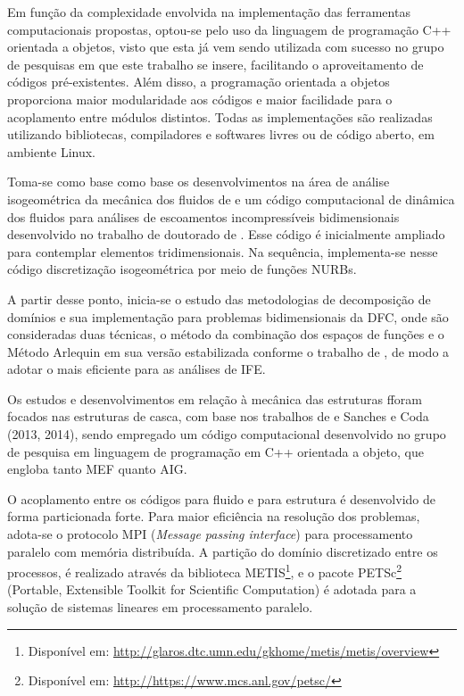 Em função da complexidade envolvida na implementação das ferramentas computacionais propostas, optou-se pelo uso da linguagem de programação C++ orientada a objetos, visto que esta já vem sendo utilizada com sucesso no grupo de pesquisas em que este trabalho se insere, facilitando o aproveitamento de códigos pré-existentes. Além disso, a programação orientada a objetos proporciona maior modularidade aos códigos e maior facilidade para o acoplamento entre módulos distintos. Todas as implementações são realizadas utilizando bibliotecas, compiladores e softwares livres ou de código aberto, em ambiente Linux.

Toma-se como base como base os desenvolvimentos na área de análise isogeométrica da mecânica dos fluidos de   e um código computacional de dinâmica dos fluidos para análises de escoamentos incompressíveis bidimensionais desenvolvido no trabalho de doutorado de . Esse código é inicialmente ampliado para contemplar elementos tridimensionais. Na sequência, implementa-se nesse código discretização isogeométrica por meio de funções NURBs.

A partir desse ponto, inicia-se o estudo das metodologias de decomposição de domínios e sua implementação para problemas bidimensionais da DFC, onde são consideradas duas técnicas, o método da combinação dos espaços de funções \cite{Rosa:2021,Rosa:2022} e o Método Arlequin em sua versão estabilizada conforme o trabalho de , de modo a adotar o mais eficiente para as análises de IFE.

Os estudos e desenvolvimentos em relação à mecânica das estruturas fforam focados nas estruturas de casca, com base nos trabalhos de  e Sanches e Coda (2013, 2014), sendo empregado um código computacional desenvolvido no grupo de pesquisa em linguagem de programação em C++ orientada a objeto, que engloba tanto MEF quanto AIG.

O acoplamento entre os códigos para fluido e para estrutura é desenvolvido de forma particionada forte. Para maior eficiência na resolução dos problemas, adota-se o protocolo MPI (\textit{Message passing interface}) para processamento paralelo com memória distribuída. A partição do domínio discretizado entre os processos,  é realizado através da biblioteca METIS\footnote{Disponível em: \url{http://glaros.dtc.umn.edu/gkhome/metis/metis/overview}}, e o pacote  PETSc\footnote{Disponível em: \url{http://https://www.mcs.anl.gov/petsc/}} (Portable, Extensible Toolkit for Scientific Computation) é adotada para a solução de sistemas lineares  em processamento paralelo.

